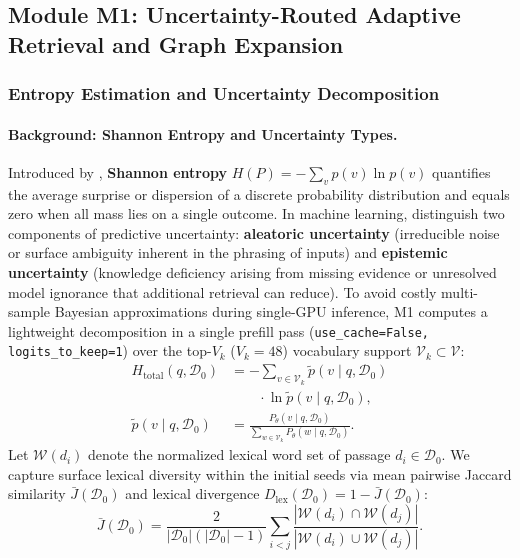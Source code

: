 \documentclass[11pt]{article}
\begin{document}
\subsection{Module M1: Uncertainty-Routed Adaptive Retrieval and Graph Expansion}

\subsubsection{Entropy Estimation and Uncertainty Decomposition}
\paragraph{Background: Shannon Entropy and Uncertainty Types.}
Introduced by \citet{shannon1948mathematical}, \textbf{Shannon entropy} $H(P) = -\sum_v p(v)\ln p(v)$ quantifies the average surprise or dispersion of a discrete probability distribution and equals zero when all mass lies on a single outcome. In machine learning, \citet{hullermeier2021aleatoric} distinguish two components of predictive uncertainty: \textbf{aleatoric uncertainty} (irreducible noise or surface ambiguity inherent in the phrasing of inputs) and \textbf{epistemic uncertainty} (knowledge deficiency arising from missing evidence or unresolved model ignorance that additional retrieval can reduce). To avoid costly multi-sample Bayesian approximations during single-GPU inference, M1 computes a lightweight decomposition in a single prefill pass (\texttt{use\_cache=False, logits\_to\_keep=1}) over the top-$V_k$ ($V_k = 48$) vocabulary support $\mathcal{V}_k \subset \mathcal{V}$:
\begin{align}
H_{\text{total}}(q, \mathcal{D}_0) &= -\sum_{v \in \mathcal{V}_k} \tilde{p}(v \mid q, \mathcal{D}_0) \nonumber \\
&\qquad \cdot \ln \tilde{p}(v \mid q, \mathcal{D}_0), \label{eq:m1_htotal} \\
\tilde{p}(v \mid q, \mathcal{D}_0) &= \frac{P_{\theta}(v \mid q, \mathcal{D}_0)}{\sum_{w \in \mathcal{V}_k} P_{\theta}(w \mid q, \mathcal{D}_0)}. \nonumber
\end{align}
Let $\mathcal{W}(d_i)$ denote the normalized lexical word set of passage $d_i \in \mathcal{D}_0$. We capture surface lexical diversity within the initial seeds via mean pairwise Jaccard similarity $\bar{J}(\mathcal{D}_0)$ and lexical divergence $D_{\text{lex}}(\mathcal{D}_0) = 1 - \bar{J}(\mathcal{D}_0)$:
\begin{equation}
\bar{J}(\mathcal{D}_0) = \frac{2}{|\mathcal{D}_0|(|\mathcal{D}_0|-1)} \sum_{i < j} \frac{|\mathcal{W}(d_i) \cap \mathcal{W}(d_j)|}{|\mathcal{W}(d_i) \cup \mathcal{W}(d_j)|}.
\label{eq:m1_jbar}
\end{equation}
\end{document}
